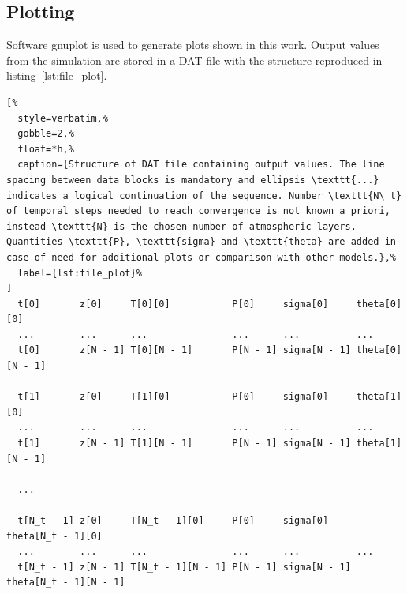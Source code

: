 \documentclass[a4paper,10pt,twocolumn,\classoptions]{article}
\begin{document}
\subsection{Plotting}
\label{sec:Plotting}
Software gnuplot is used to generate plots shown in this work. Output values from the simulation are stored in a DAT file with the structure reproduced in listing~\ref{lst:file_plot}.
\begin{lstlisting}[%
  style=verbatim,%
  gobble=2,%
  float=*h,%
  caption={Structure of DAT file containing output values. The line spacing between data blocks is mandatory and ellipsis \texttt{...} indicates a logical continuation of the sequence. Number \texttt{N\_t} of temporal steps needed to reach convergence is not known a priori, instead \texttt{N} is the chosen number of atmospheric layers. Quantities \texttt{P}, \texttt{sigma} and \texttt{theta} are added in case of need for additional plots or comparison with other models.},%
  label={lst:file_plot}%
]
  t[0]       z[0]     T[0][0]           P[0]     sigma[0]     theta[0][0]
  ...        ...      ...               ...      ...          ...
  t[0]       z[N - 1] T[0][N - 1]       P[N - 1] sigma[N - 1] theta[0][N - 1]

  t[1]       z[0]     T[1][0]           P[0]     sigma[0]     theta[1][0]
  ...        ...      ...               ...      ...          ...
  t[1]       z[N - 1] T[1][N - 1]       P[N - 1] sigma[N - 1] theta[1][N - 1]

  ...

  t[N_t - 1] z[0]     T[N_t - 1][0]     P[0]     sigma[0]     theta[N_t - 1][0]
  ...        ...      ...               ...      ...          ...
  t[N_t - 1] z[N - 1] T[N_t - 1][N - 1] P[N - 1] sigma[N - 1] theta[N_t - 1][N - 1]
\end{lstlisting}



\newpage
\printbibliography[heading=bibintoc]
\end{document}

